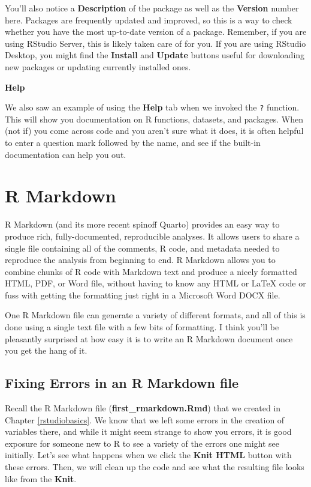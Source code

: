 \documentclass[]{tufte-book}
\begin{document}
You'll also notice a \textbf{Description} of the package as well as the \textbf{Version} number here. Packages are frequently updated and improved, so this is a way to check whether you have the most up-to-date version of a package. Remember, if you are using RStudio Server, this is likely taken care of for you. If you are using RStudio Desktop, you might find the \textbf{Install} and \textbf{Update} buttons useful for downloading new packages or updating currently installed ones.

\vspace*{0.2in}

\noindent\textbf{Help}\vspace*{0.1in}

We also saw an example of using the \textbf{Help} tab when we invoked the \texttt{?} function. This will show you documentation on R functions, datasets, and packages. When (not if) you come across code and you aren't sure what it does, it is often helpful to enter a question mark followed by the name, and see if the built-in documentation can help you out.

\chapter{R Markdown}\label{rmarkdown}

R Markdown (and its more recent spinoff Quarto) provides an easy way to produce rich, fully-documented, reproducible analyses. It allows users to share a single file containing all of the comments, R code, and metadata needed to reproduce the analysis from beginning to end. R Markdown allows you to combine chunks of R code with Markdown text and produce a nicely formatted HTML, PDF, or Word file, without having to know any HTML or LaTeX code or fuss with getting the formatting just right in a Microsoft Word DOCX file.

One R Markdown file can generate a variety of different formats, and all of this is done using a single text file with a few bits of formatting. I think you'll be pleasantly surprised at how easy it is to write an R Markdown document once you get the hang of it.

\section{Fixing Errors in an R Markdown file}\label{fixerrors}

Recall the R Markdown file (\textbf{first\_rmarkdown.Rmd}) that we created in Chapter \ref{rstudiobasics}. We know that we left some errors in the creation of variables there, and while it might seem strange to show you errors, it is good exposure for someone new to R to see a variety of the errors one might see initially. Let's see what happens when we click the \textbf{Knit HTML} button with these errors. Then, we will clean up the code and see what the resulting file looks like from the \textbf{Knit}.
\end{document}
